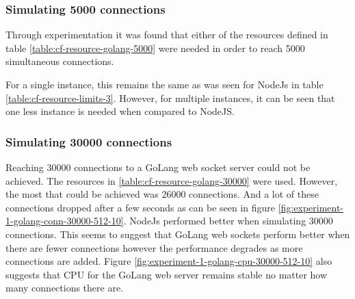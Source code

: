 \subsubsection{Simulating 5000 connections}

Through experimentation it was found that either of the resources defined in table \ref{table:cf-resource-golang-5000} were needed in order to reach 5000 simultaneous connections.

\begin{table}[H]
\caption{Cloud Foundry Resource Limits}
\label{table:cf-resource-golang-5000}
\end{table}

For a single instance, this remains the same as was seen for NodeJs in table \ref{table:cf-resource-limits-3}. However, for multiple instances, it can be seen that one less instance is needed when compared to NodeJS. 

\subsubsection{Simulating 30000 connections}

Reaching 30000 connections to a GoLang web socket server could not be achieved. The resources in \ref{table:cf-resource-golang-30000} were used. However, the most that could be achieved was 26000 connections. And a lot of these connections dropped after a few seconds as can be seen in figure \ref{fig:experiment-1-golang-conn-30000-512-10}. NodeJs performed better when simulating 30000 connections. This seems to suggest that GoLang web sockets perform better when there are fewer connections however the performance degrades as more connections are added. Figure \ref{fig:experiment-1-golang-cpu-30000-512-10} also suggests that CPU for the GoLang web server remains stable no matter how many connections there are.

\begin{table}[H]
\caption{Cloud Foundry Resource Limits}
\label{table:cf-resource-golang-30000}
\end{table}

